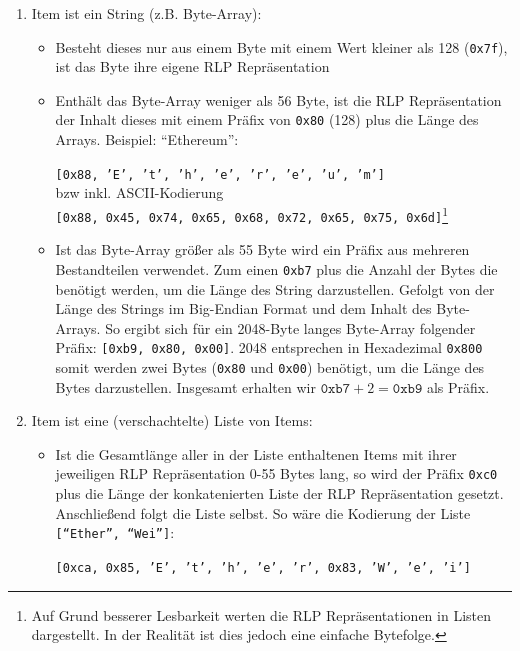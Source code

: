 \documentclass[runningheads]{llncs}
\begin{document}
\begin{enumerate}
  \item Item ist ein String (z.B. Byte-Array):
        \begin{itemize}
          \item Besteht dieses nur aus einem Byte mit einem Wert kleiner als 128 (\texttt{0x7f}), ist das Byte ihre eigene RLP Repräsentation
          \item Enthält das Byte-Array weniger als 56 Byte, ist die RLP Repräsentation der Inhalt dieses mit einem Präfix von \texttt{0x80} (128) plus die Länge des Arrays. Beispiel: "`Ethereum"':
                \begin{center}
                  \texttt{[0x88, 'E', 't', 'h', 'e', 'r', 'e', 'u', 'm']}\\
                  bzw inkl. ASCII-Kodierung\\
                  \texttt{[0x88, 0x45, 0x74, 0x65, 0x68, 0x72, 0x65, 0x75, 0x6d]}\footnote{Auf Grund besserer Lesbarkeit werten die RLP Repräsentationen in Listen dargestellt. In der Realität ist dies jedoch eine einfache Bytefolge.}
                \end{center}
          \item Ist das Byte-Array größer als 55 Byte wird ein Präfix aus mehreren Bestandteilen verwendet. Zum einen \texttt{0xb7} plus die Anzahl der Bytes die benötigt werden, um die Länge des String darzustellen. Gefolgt von der Länge des Strings im Big-Endian Format und dem Inhalt des Byte-Arrays. So ergibt sich für ein 2048-Byte langes Byte-Array folgender Präfix: \texttt{[0xb9, 0x80, 0x00]}.
                2048 entsprechen in Hexadezimal \texttt{0x800} somit werden zwei Bytes (\texttt{0x80} und \texttt{0x00}) benötigt, um die Länge des Bytes darzustellen. Insgesamt erhalten wir $\texttt{0xb7} + 2 = \texttt{0xb9}$ als Präfix.
        \end{itemize}
  \item Item ist eine (verschachtelte) Liste von Items:
        \begin{itemize}
          \item Ist die Gesamtlänge aller in der Liste enthaltenen Items mit ihrer jeweiligen RLP Repräsentation 0-55 Bytes lang, so wird der Präfix \texttt{0xc0} plus die Länge der konkatenierten Liste der RLP Repräsentation gesetzt. Anschließend folgt die Liste selbst. So wäre die Kodierung der Liste \texttt{["`Ether"', "`Wei"']}:
                \begin{center}
                  \texttt{[0xca, 0x85, 'E', 't', 'h', 'e', 'r', 0x83, 'W', 'e', 'i']}\\

\end{center}
\end{itemize}
\end{enumerate}
\end{document}
